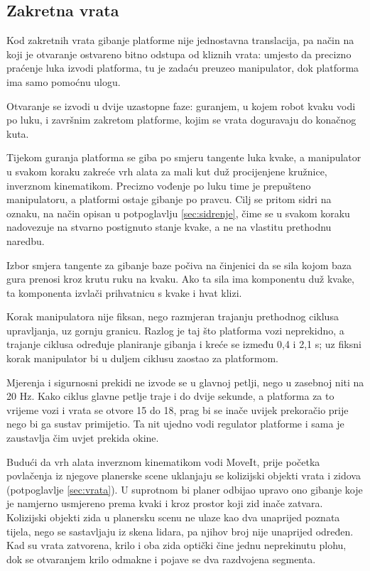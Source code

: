 \subsection{Zakretna vrata}
\label{sec:otvaranje-zakretna}

Kod zakretnih vrata gibanje platforme nije jednostavna translacija, pa način na koji je
otvaranje ostvareno bitno odstupa od kliznih vrata: umjesto da precizno praćenje luka izvodi
platforma, tu je zadaću preuzeo manipulator, dok platforma ima samo pomoćnu ulogu.

Otvaranje se izvodi u dvije uzastopne faze: guranjem, u kojem robot kvaku vodi po luku, i
završnim zakretom platforme, kojim se vrata doguravaju do konačnog kuta.

Tijekom guranja platforma se giba po smjeru tangente luka kvake, a manipulator u svakom koraku
zakreće vrh alata za mali kut duž procijenjene kružnice, inverznom kinematikom. Precizno vođenje
po luku time je prepušteno manipulatoru, a platformi ostaje gibanje po pravcu. Cilj se pritom
sidri na oznaku, na način opisan u potpoglavlju \ref{sec:sidrenje}, čime se u svakom koraku
nadovezuje na stvarno postignuto stanje kvake, a ne na vlastitu prethodnu naredbu.

Izbor smjera tangente za gibanje baze počiva na činjenici da se sila kojom baza gura prenosi kroz
krutu ruku na kvaku. Ako ta sila ima komponentu duž kvake, ta komponenta izvlači prihvatnicu s
kvake i hvat klizi.

Korak manipulatora nije fiksan, nego razmjeran trajanju prethodnog ciklusa upravljanja, uz gornju
granicu. Razlog je taj što platforma vozi neprekidno, a trajanje ciklusa određuje planiranje
gibanja i kreće se između 0,4 i 2,1 s; uz fiksni korak manipulator bi u duljem ciklusu zaostao za
platformom.

Mjerenja i sigurnosni prekidi ne izvode se u glavnoj petlji, nego u zasebnoj niti na 20 Hz. Kako
ciklus glavne petlje traje i do dvije sekunde, a platforma za to vrijeme vozi i vrata se otvore
15 do 18\textdegree{}, prag bi se inače uvijek prekoračio prije nego bi ga sustav primijetio. Ta
nit ujedno vodi regulator platforme i sama je zaustavlja čim uvjet prekida okine.

Budući da vrh alata inverznom kinematikom vodi MoveIt, prije početka povlačenja iz njegove
planerske scene uklanjaju se kolizijski objekti vrata i zidova (potpoglavlje \ref{sec:vrata}).
U suprotnom bi planer odbijao upravo ono gibanje koje je namjerno usmjereno prema kvaki i
kroz prostor koji zid inače zatvara. Kolizijski objekti zida u planersku scenu ne ulaze kao dva
unaprijed poznata tijela, nego se sastavljaju iz skena lidara, pa njihov broj nije unaprijed
određen. Kad su vrata zatvorena, krilo i oba zida optički čine jednu neprekinutu plohu, dok se
otvaranjem krilo odmakne i pojave se dva razdvojena segmenta.

